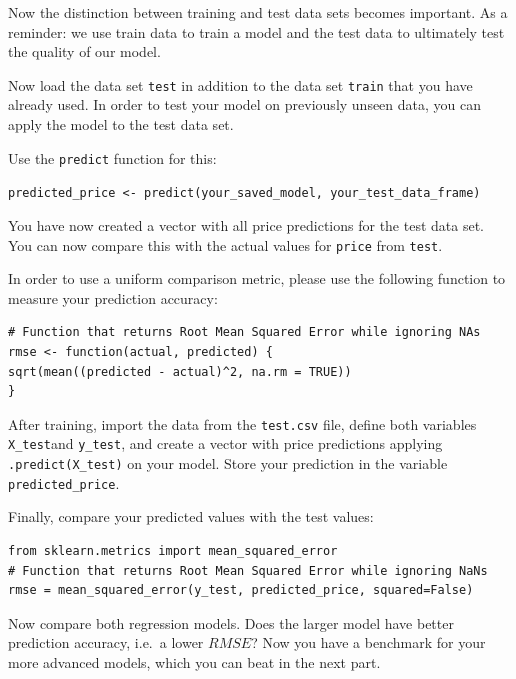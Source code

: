 \documentclass[
  11pt,
]{article}
\newenvironment{tips}[1]
  {
  \begin{itemize}
  \footnotesize
  \renewcommand{\labelitemi}{
    \raisebox{-.7\height}[0pt][0pt]{
      {\setkeys{Gin}{width=3em,keepaspectratio}
        \texttt{[image: images/\#1.png]}}
    }
  }
  \setlength{\fboxsep}{1em}
  \begin{rbox}
  \item
  }
  {
  \end{rbox}
  \end{itemize}
  }
\newenvironment{tipsp}[1]
  {
  \begin{itemize}
  \footnotesize
  \renewcommand{\labelitemi}{
    \raisebox{-.7\height}[0pt][0pt]{
      {\setkeys{Gin}{width=3em,keepaspectratio}
        \texttt{[image: images/\#1.png]}}
    }
  }
  \setlength{\fboxsep}{1em}
  \begin{pbox}
  \item
  }
  {
  \end{pbox}
  \end{itemize}
  }
\begin{document}
Now the distinction between training and test data sets becomes important. As a reminder: we use train data to train a model and the test data to ultimately test the quality of our model.

Now load the data set \texttt{test} in addition to the data set \texttt{train} that you have already used. In order to test your model on previously unseen data, you can apply the model to the test data set.

\begin{tips}r

Use the \texttt{predict} function for this:

\texttt{predicted\_price\ \textless{}-\ predict(your\_saved\_model,\ your\_test\_data\_frame)}

You have now created a vector with all price predictions for the test data set. You can now compare this with the actual values for \texttt{price} from \texttt{test}.

In order to use a uniform comparison metric, please use the following function to measure your prediction accuracy:

\begin{verbatim}
# Function that returns Root Mean Squared Error while ignoring NAs
rmse <- function(actual, predicted) {
sqrt(mean((predicted - actual)^2, na.rm = TRUE))
}
\end{verbatim}

\end{tips}

\begin{tipsp}p

After training, import the data from the \texttt{test.csv} file, define both variables \texttt{X\_test}and \texttt{y\_test}, and create a vector with price predictions applying \texttt{.predict(X\_test)} on your model. Store your prediction in the variable \texttt{predicted\_price}.

Finally, compare your predicted values with the test values:

\begin{verbatim}
from sklearn.metrics import mean_squared_error
# Function that returns Root Mean Squared Error while ignoring NaNs
rmse = mean_squared_error(y_test, predicted_price, squared=False)
\end{verbatim}

\end{tipsp}

Now compare both regression models. Does the larger model have better prediction accuracy, i.e.~a lower \(RMSE\)? Now you have a benchmark for your more advanced models, which you can beat in the next part.
\end{document}
